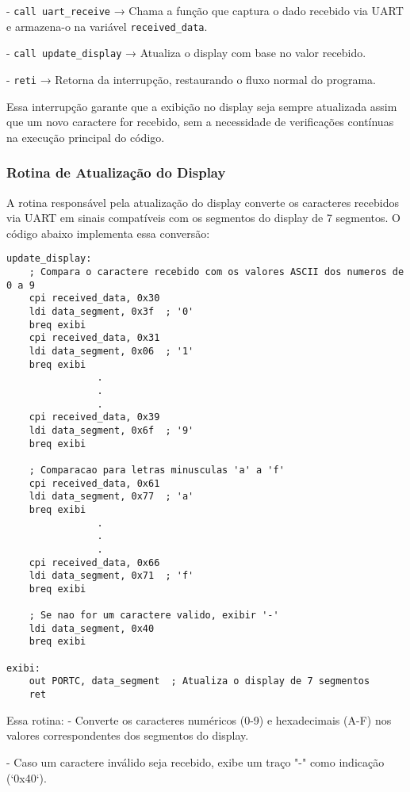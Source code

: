 \documentclass{sbrt}
\begin{document}
- \texttt{call uart\_receive} → Chama a função que captura o dado recebido via UART e armazena-o na variável \texttt{received\_data}.

- \texttt{call update\_display} → Atualiza o display com base no valor recebido.

- \texttt{reti} → Retorna da interrupção, restaurando o fluxo normal do programa.

Essa interrupção garante que a exibição no display seja sempre atualizada assim que um novo caractere for recebido, sem a necessidade de verificações contínuas na execução principal do código.

\subsubsection{Rotina de Atualização do Display}

A rotina responsável pela atualização do display converte os caracteres recebidos via UART em sinais compatíveis com os segmentos do display de 7 segmentos. O código abaixo implementa essa conversão:

\begin{lstlisting}[style=assemblyStyle, caption={Rotina de Atualizacao do Display de 7 Segmentos}, label={lst:update_display}]
update_display:
    ; Compara o caractere recebido com os valores ASCII dos numeros de 0 a 9
    cpi received_data, 0x30
    ldi data_segment, 0x3f  ; '0'
    breq exibi
    cpi received_data, 0x31
    ldi data_segment, 0x06  ; '1'
    breq exibi
                .
                .
                .
    cpi received_data, 0x39
    ldi data_segment, 0x6f  ; '9'
    breq exibi

    ; Comparacao para letras minusculas 'a' a 'f'
    cpi received_data, 0x61
    ldi data_segment, 0x77  ; 'a'
    breq exibi
                .
                .
                .
    cpi received_data, 0x66
    ldi data_segment, 0x71  ; 'f'
    breq exibi

    ; Se nao for um caractere valido, exibir '-'
    ldi data_segment, 0x40
    breq exibi

exibi:
    out PORTC, data_segment  ; Atualiza o display de 7 segmentos
    ret
\end{lstlisting}

Essa rotina:
- Converte os caracteres numéricos (0-9) e hexadecimais (A-F) nos valores correspondentes dos segmentos do display.

- Caso um caractere inválido seja recebido, exibe um traço "-" como indicação (`0x40`).
\end{document}
